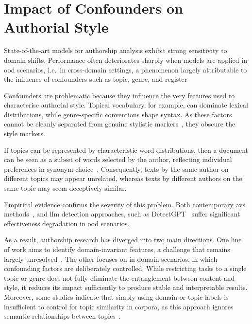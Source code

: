 \section{Impact of Confounders on Authorial Style}
\label{sec:contextual_factors}

State-of-the-art models for authorship analysis exhibit strong sensitivity to domain shifts. 
Performance often deteriorates sharply when models are applied in \ac{ood} scenarios, i.e.\ in cross-domain settings, a phenomenon largely attributable to the influence of confounders such as topic, genre, and register~\citep{Sundararajan_style_18,bischoff_importance_2020}

Confounders are problematic because they influence the very features used to characterise authorial style. 
Topical vocabulary, for example, can dominate lexical distributions, while genre-specific conventions shape syntax. 
As these factors cannot be cleanly separated from genuine stylistic markers~\citep{bischoff_importance_2020}, they obscure the style markers.

If topics can be represented by characteristic word distributions, then a document can be seen as a subset of words selected by the author, reflecting individual preferences in synonym choice~\citep{altakrori_topic_2021}. 
Consequently, texts by the same author on different topics may appear unrelated, whereas texts by different authors on the same topic may seem deceptively similar.

Empirical evidence confirms the severity of this problem.
Both contemporary \acp{av} methods~\citep{Thomas_cross_topic_24}, and \ac{llm} detection approaches, such as DetectGPT~\citep{mitchell_detectgpt_2023,Wu_ODD_challenges_2025} suffer significant effectiveness degradation in \ac{ood} scenarios.

As a result, authorship research has diverged into two main directions. 
One line of work aims to identify domain-invariant features, a challenge that remains largely unresolved~\citep{bischoff_importance_2020}. 
The other focuses on in-domain scenarios, in which confounding factors are deliberately controlled. %
While restricting tasks to a single topic or genre does not fully eliminate the entanglement between content and style, it reduces its impact sufficiently to produce stable and interpretable results. 
Moreover, some studies indicate that simply using domain or topic labels is insufficient to control for topic similarity in corpora, as this approach ignores semantic relationships between topics~\citep{sawatphol_cross_topic_av_24}.
